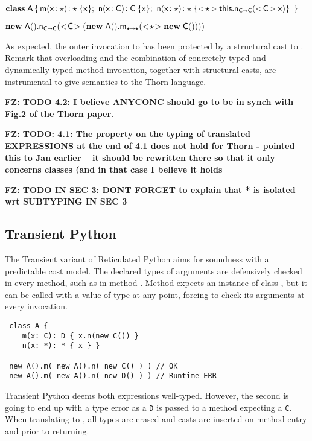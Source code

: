 \documentclass[acmlarge, anonymous, authordraft, review]{acmart} %
\newcommand{\code}[1]{{\tt #1}\xspace}
\newcommand{\FZ}[1]{\textbf{FZ: #1}}
\begin{document}
\medskip
\(
 \Class \A {
    \Mdef \m\x\any \any  \x  ; \ 
    \Mdef \n\x\C\C  \x ; \  \Mdef \n\x\any\any {\SubCast \any {\KCall \this \n {\SubCast \C \x}  \C \C }}   %
    }
\)
\medskip


\( \KCall {\New \A{}} \n {\SubCast \C {( \KCall {\New \A{}} \m {\SubCast \any {\New \C{}}} \any \any)}} \C \C \)

\medskip

\noindent As expected, the outer invocation to \n has been protected by a structural cast to \C.  Remark that \kafka overloading and the combination of concretely typed and dynamically typed method invocation, together with structural casts, are instrumental to give semantics to the Thorn language.


\medskip
 \FZ{TODO 4.2: I believe ANYCONC should go to be in synch with Fig.2 of the Thorn paper}.
 
\FZ{TODO: 4.1: The property on the typing of translated EXPRESSIONS at the end of 4.1 does not hold for Thorn - pointed this to Jan earlier -- it should be rewritten there so that it only concerns classes (and in that case I believe it holds }

\FZ{TODO IN SEC 3: DONT FORGET to explain that * is isolated wrt SUBTYPING IN SEC 3}

\subsection{Transient Python}

The Transient variant of Reticulated Python aims for soundness
with a predictable cost model. The declared types of arguments are defensively
checked in every method, such as in method \m. Method \m expects an instance of
class \C, but it can be called with a value of type \any at any point, forcing
\m to check its arguments at every invocation.

\begin{lstlisting}
 class A {
    m(x: C): D { x.n(new C()) }
    n(x: *): * { x } }

 new A().m( new A().n( new C() ) ) // OK
 new A().m( new A().n( new D() ) ) // Runtime ERR
\end{lstlisting}

\noindent Transient Python deems both expressions well-typed. However, the
second is going to end up with a type error as a \code D is passed to a method
expecting a \code C.  When translating to \kafka, all types are erased and casts
are inserted on method entry and prior to returning.
\end{document}
